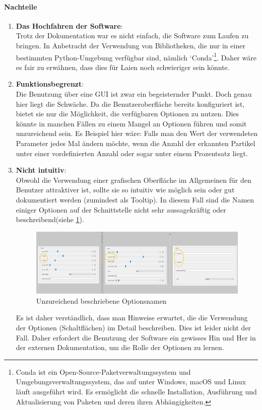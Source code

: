 	\paragraph{Nachteile}
		\begin{enumerate}
				\item \textbf{Das Hochfahren der Software}:\\
				Trotz der Dokumentation war es nicht einfach, die Software zum Laufen zu bringen. In Anbetracht der Verwendung von Bibliotheken, die nur in einer bestimmten Python-Umgebung  verfügbar sind, nämlich `Conda'\footnote{Conda ist ein Open-Source-Paketverwaltungssystem und Umgebungsverwaltungssystem, das auf unter Windows, macOS und Linux läuft ausgeführt wird. Es ermöglicht die schnelle Installation, Ausführung und Aktualisierung von Paketen und deren ihren Abhängigkeiten.}.
Daher wäre es fair zu erwähnen, dass dies für Laien noch schwieriger sein könnte.
				
    			\item \textbf{Funktionsbegrenzt}:\\
				Die Benutzung über eine GUI ist zwar ein begeisternder Punkt. Doch genau hier liegt die Schwäche. Da die Benutzeroberfläche bereits konfiguriert ist, bietet sie nur die Möglichkeit, die verfügbaren Optionen zu nutzen. Dies könnte in manchen Fällen zu einem Mangel an Optionen führen und somit unzureichend sein. Es Beispiel hier wäre: Falls man den Wert der verwendeten Parameter jedes Mal ändern möchte, wenn die Anzahl der erkannten Partikel unter einer vordefinierten Anzahl oder sogar unter einem Prozentsatz liegt. 			
    			
    			\item \textbf{Nicht intuitiv}:\\
    			Obwohl die Verwendung einer grafischen Oberfläche im Allgemeinen für den Benutzer attraktiver ist, sollte sie so intuitiv wie möglich sein oder gut dokumentiert werden (zumindest als Tooltip).
In diesem Fall sind die Namen einiger Optionen auf der Schnittstelle nicht sehr aussagekräftig oder beschreibend(siehe \ref{fig:kap1_PT_Nicht_Intuitiv}).
\begin{figure}[H]
    \centering
    \includegraphics[scale=0.35]{Grafiken/particletracker/Not intuitive.png}
    \caption{Unzureichend beschriebene Optionsnamen}
    \label{fig:kap1_PT_Nicht_Intuitiv}
\end{figure}
Es ist daher verständlich, dass man Hinweise erwartet, die die Verwendung der Optionen (Schaltflächen) im Detail beschreiben. 
Dies ist leider nicht der Fall. Daher erfordert die Benutzung der Software ein gewisses Hin und Her in der externen Dokumentation, um die Rolle der Optionen zu lernen.
\end{enumerate}
		
